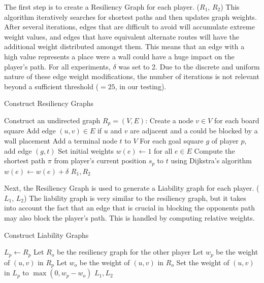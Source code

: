 \documentclass[10pt]{article}
\begin{document}
The first step is to create a Resiliency Graph for each player. ($R_1$, $R_2$) This algorithm iteratively searches for shortest paths and then updates graph weights. After several iterations, edges that are difficult to avoid will accumulate extreme weight values, and edges that have equivalent alternate routes will have the additional weight distributed amongst them. This means that an edge with a high value represents a place were a wall could have a huge impact on the player's path. For all experiments, $\delta$ was set to 2. Due to the discrete and uniform nature of these edge weight modifications, the number of iterations is not relevant beyond a sufficient threshold ($=25$, in our testing).
\begin{algorithm}
\caption{Construct Resiliency Graphs}
\begin{algorithmic}[1]
    \State Construct an undirected graph $R_p = (V, E)$:
    \State \hspace{1em} Create a node $v \in V$ for each board square
    \State \hspace{1em} Add edge $(u, v) \in E$ if $u$ and $v$ are adjacent and a could be blocked by a wall placement
    \State \hspace{1em} Add a terminal node $t$ to $V$
    \State \hspace{1em} For each goal square $g$ of player $p$, add edge $(g, t)$
    \State \hspace{1em} Set initial weights $w(e) \gets 1$ for all $e \in E$
        \State Compute the shortest path $\pi$ from player’s current position $s_p$ to $t$ using Dijkstra's algorithm
            \State $w(e) \gets w(e) + \delta$
        \EndFor
    \EndFor
\EndFor
\State \Return $R_1, R_2$
\end{algorithmic}
\end{algorithm}
\FloatBarrier
Next, the Resiliency Graph is used to generate a Liability graph for each player. ($L_1$, $L_2$) The liability graph is very similar to the resiliency graph, but it takes into account the fact that an edge that is crucial in blocking the opponents path may also block the player's path. This is handled by computing relative weights.  

\begin{algorithm}
\caption{Construct Liability Graphs}
\begin{algorithmic}[1]
    \State $L_p \gets R_p$
    \State Let $R_o$ be the resiliency graph for the other player
        \State Let $w_p$ be the weight of $(u, v)$ in $R_p$
        \State Let $w_o$ be the weight of $(u, v)$ in $R_o$
        \State Set the weight of $(u, v)$ in $L_p$ to $\max(0, w_p - w_o)$
    \EndFor
\EndFor
\State \Return $L_1, L_2$
\end{algorithmic}
\end{algorithm}
\end{document}
